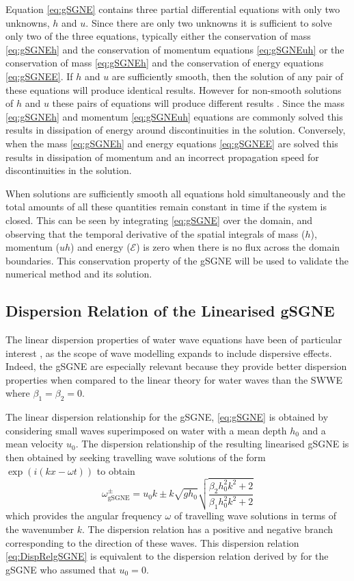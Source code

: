 \documentclass[10pt]{elsarticle}
\begin{document}
Equation \eqref{eq:gSGNE} contains three partial differential equations with only two unknowns, $h$ and $u$. Since there are only two unknowns it is sufficient to solve only two of the three equations, typically either the conservation of mass  \eqref{eq:gSGNEh} and the conservation of momentum equations \eqref{eq:gSGNEuh} or the conservation of mass  \eqref{eq:gSGNEh} and the conservation of energy equations \eqref{eq:gSGNEE}. If $h$ and $u$ are sufficiently smooth, then the solution of any pair of these equations will produce identical results. However for non-smooth solutions of $h$ and $u$ these pairs of equations will produce different results \cite{Pu-2018-1361}. Since the mass \eqref{eq:gSGNEh} and momentum \eqref{eq:gSGNEuh} equations are commonly solved this results in dissipation of energy around discontinuities in the solution. Conversely, when the mass \eqref{eq:gSGNEh} and energy equations \eqref{eq:gSGNEE} are solved this results in dissipation of momentum and an incorrect propagation speed for discontinuities in the solution.

When solutions are sufficiently smooth all equations hold simultaneously and the total amounts of all these quantities remain constant in time if the system is closed. This can be seen by integrating \eqref{eq:gSGNE} over the domain, and observing that the temporal derivative of the spatial integrals of mass ($h$), momentum ($uh$) and energy ($\mathcal{E}$) is zero when there is no flux across the domain boundaries. This conservation property of the gSGNE will be used to validate the numerical method and its solution. 

\subsection{Dispersion Relation of the Linearised gSGNE}
The linear dispersion properties of water wave equations have been of particular interest \cite{Clamond-et.al-2017-245,Filippini-etal-2016-381,DoCarmo-2019-125}, as the scope of wave modelling expands to include dispersive effects. Indeed, the gSGNE are especially relevant because they provide better dispersion properties when compared to the linear theory for water waves \cite{Whitham-1967-399} than the SWWE where $\beta_1 = \beta_2 = 0$.

The linear dispersion relationship for the gSGNE, \eqref{eq:gSGNE} is obtained by considering small waves superimposed on water with a mean depth $h_0$ and a mean velocity $u_0$. The dispersion relationship of the resulting linearised gSGNE is then obtained by seeking travelling wave solutions of the form $\exp\left(i (k x - \omega t)\right)$ to obtain
\begin{equation}
\omega^\pm_\text{gSGNE} = u_0 k \pm k \sqrt{gh_0} \sqrt{\dfrac{\beta_2 h_0^2 k^2 + 2}{\beta_1 h_0^2 k^2 + 2} }
\label{eq:DispRelgSGNE}
\end{equation}
which provides the angular frequency $\omega$ of travelling wave solutions in terms of the wavenumber $k$. The dispersion relation has a positive and negative branch corresponding to the direction of these waves. This dispersion relation \eqref{eq:DispRelgSGNE} is equivalent to the dispersion relation derived by \citet{Clamond-Dutykh-2018-237} for the gSGNE who assumed that $u_0 = 0$. 
\end{document}
